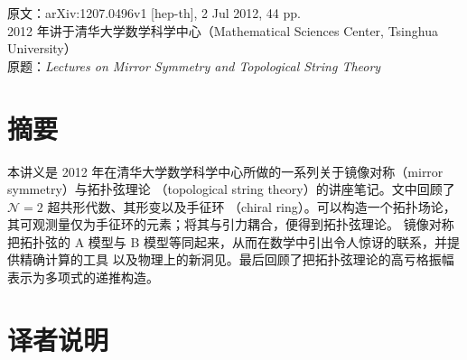 
\maketitle
\thispagestyle{empty}

\begin{center}
  {\small 原文：arXiv:1207.0496v1 [hep-th], 2 Jul 2012, 44 pp.}\\[2pt]
  {\small 2012 年讲于清华大学数学科学中心（Mathematical Sciences Center, Tsinghua University）}\\[2pt]
  {\small 原题：\emph{Lectures on Mirror Symmetry and Topological String Theory}}
\end{center}

\vspace{1.2em}
\newpage

\section*{摘要}

本讲义是 2012 年在清华大学数学科学中心所做的一系列关于镜像对称（mirror symmetry）与拓扑弦理论
（topological string theory）的讲座笔记。文中回顾了 $\mathcal{N}=2$ 超共形代数、其形变以及手征环
（chiral ring）。可以构造一个拓扑场论，其可观测量仅为手征环的元素；将其与引力耦合，便得到拓扑弦理论。
镜像对称把拓扑弦的 A 模型与 B 模型等同起来，从而在数学中引出令人惊讶的联系，并提供精确计算的工具
以及物理上的新洞见。最后回顾了把拓扑弦理论的高亏格振幅表示为多项式的递推构造。

\section*{译者说明}

